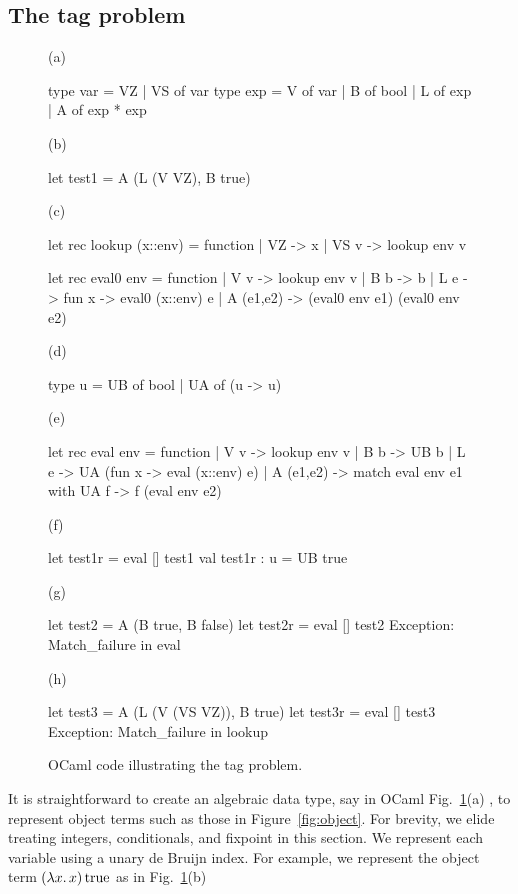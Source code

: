 \subsection{The tag problem}\label{tagproblem}


\begin{figure}
%
(a)\vspace{-10pt}
\begin{code}
type var = VZ | VS of var
type exp = V of var | B of bool | L of exp | A of exp * exp
\end{code}
%
(b)\vspace{-10pt}
\begin{code}
let test1 = A (L (V VZ), B true)
\end{code}
%
(c)\vspace{-10pt}
\begin{code}
let rec lookup (x::env) = function
| VZ   -> x
| VS v -> lookup env v

let rec eval0 env = function
| V v       -> lookup env v
| B b       -> b 
| L e       -> fun x -> eval0 (x::env) e
| A (e1,e2) -> (eval0 env e1) (eval0 env e2) 
\end{code}
%
(d)\vspace{-10pt}
\begin{code}
type u = UB of bool | UA of (u -> u)
\end{code}
%
(e)\vspace{-10pt}
\begin{code}
let rec eval env = function
| V v       -> lookup env v
| B b       -> UB b
| L e       -> UA (fun x -> eval (x::env) e)
| A (e1,e2) -> match eval env e1 with UA f -> f (eval env e2)
\end{code}
%
(f)\vspace{-10pt}
\begin{code}
let test1r = eval [] test1
val test1r : u = UB true 
\end{code}
%
(g)\vspace{-10pt}
\begin{code}
let test2 = A (B true, B false)
let test2r = eval [] test2
Exception: Match_failure in eval
\end{code}
%
(h)\vspace{-10pt}
\begin{code}
let test3 = A (L (V (VS VZ)), B true)
let test3r = eval [] test3
Exception: Match_failure in lookup
\end{code}
%
\caption{OCaml code illustrating the tag problem.}
\label{fig:tag-problem}
\end{figure}
It is straightforward to create an algebraic data type, say in OCaml%
Fig.~\ref{fig:tag-problem}(a)%
, to
represent object terms such as those in Figure~\ref{fig:object}.
For brevity, we elide treating integers, conditionals, and fixpoint in
this section.
We represent each variable using a unary de Bruijn index.
For example, we represent the object term $(\mathopen{\lambda\mathord{x}.\,}x)\mathinner{\mathrm{true}}$ as
in Fig.~\ref{fig:tag-problem}(b)%
 

